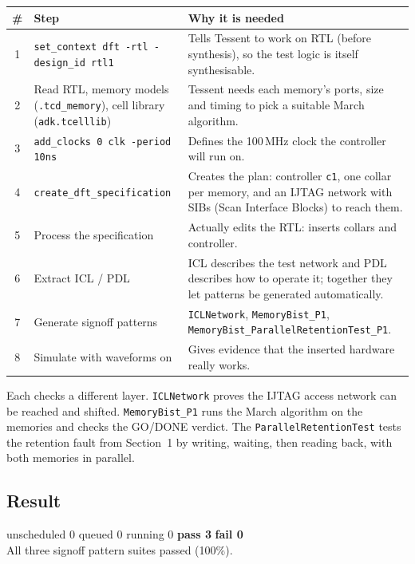 \documentclass[11pt]{article}
\newcommand{\code}[1]{\texttt{\small #1}}
\begin{document}
\begin{center}
\small
\begin{tabular}{@{}c p{5.6cm} p{7cm}@{}}
\toprule
\# & \textbf{Step} & \textbf{Why it is needed} \\ \midrule
1 & \code{set\_context dft -rtl -design\_id rtl1} & Tells Tessent to work on RTL (before synthesis), so the test logic is itself synthesisable. \\
2 & Read RTL, memory models (\code{.tcd\_memory}), cell library (\code{adk.tcelllib}) & Tessent needs each memory's ports, size and timing to pick a suitable March algorithm. \\
3 & \code{add\_clocks 0 clk -period 10ns} & Defines the 100\,MHz clock the controller will run on. \\
4 & \code{create\_dft\_specification} & Creates the plan: controller \code{c1}, one collar per memory, and an IJTAG network with SIBs (Scan Interface Blocks) to reach them. \\
5 & Process the specification & Actually edits the RTL: inserts collars and controller. \\
6 & Extract ICL / PDL & ICL describes the test network and PDL describes how to operate it; together they let patterns be generated automatically. \\
7 & Generate signoff patterns & \code{ICLNetwork}, \code{MemoryBist\_P1}, \code{MemoryBist\_ParallelRetentionTest\_P1}. \\
8 & Simulate with waveforms on & Gives evidence that the inserted hardware really works. \\ \bottomrule
\end{tabular}
\end{center}

\begin{whybox}
Each checks a different layer. \code{ICLNetwork} proves the IJTAG access network can be
reached and shifted. \code{MemoryBist\_P1} runs the March algorithm on the memories and checks the
GO/DONE verdict. The \code{ParallelRetentionTest} tests the retention fault from Section~1
by writing, waiting, then reading back, with both memories in parallel.
\end{whybox}

\subsection{Result}
\begin{resultbox}
\centering
unscheduled 0 \quad queued 0 \quad running 0 \quad \textbf{pass 3} \quad \textbf{fail 0}\\
All three signoff pattern suites passed (100\%).
\end{resultbox}
\end{document}
